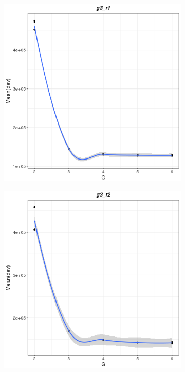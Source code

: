 \documentclass{spbau-diploma}
\begin{document}
\begin{figure}
    \hfill
      
   \begin{subfigure}[b]{0.3\textwidth}
        \includegraphics[width=\textwidth]{pics/devs/g3_r1.png}
    \end{subfigure}
    \qquad
    \begin{subfigure}[b]{0.3\textwidth}
        \includegraphics[width=\textwidth]{pics/devs/g3_r2.png}
    \end{subfigure}
      

\end{figure}
\end{document}
